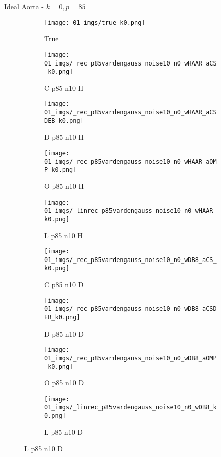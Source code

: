 \begin{frame}{Ideal Aorta - $k=0,p=85$}{}
\begin{figure}
\begin{subfigure}{0.1\textwidth}
\texttt{[image: 01\_imgs/true\_k0.png]}
\caption*{\Tiny True}
\end{subfigure}
\begin{subfigure}{0.1\textwidth}
\texttt{[image: 01\_imgs/\_rec\_p85vardengauss\_noise10\_n0\_wHAAR\_aCS\_k0.png]}
\caption*{\Tiny C p85 n10 H}
\end{subfigure}
\begin{subfigure}{0.1\textwidth}
\texttt{[image: 01\_imgs/\_rec\_p85vardengauss\_noise10\_n0\_wHAAR\_aCSDEB\_k0.png]}
\caption*{\Tiny D p85 n10 H}
\end{subfigure}
\begin{subfigure}{0.1\textwidth}
\texttt{[image: 01\_imgs/\_rec\_p85vardengauss\_noise10\_n0\_wHAAR\_aOMP\_k0.png]}
\caption*{\Tiny O p85 n10 H}
\end{subfigure}
\begin{subfigure}{0.1\textwidth}
\texttt{[image: 01\_imgs/\_linrec\_p85vardengauss\_noise10\_n0\_wHAAR\_k0.png]}
\caption*{\Tiny L p85 n10 H}
\end{subfigure}
\begin{subfigure}{0.1\textwidth}
\texttt{[image: 01\_imgs/\_rec\_p85vardengauss\_noise10\_n0\_wDB8\_aCS\_k0.png]}
\caption*{\Tiny C p85 n10 D}
\end{subfigure}
\begin{subfigure}{0.1\textwidth}
\texttt{[image: 01\_imgs/\_rec\_p85vardengauss\_noise10\_n0\_wDB8\_aCSDEB\_k0.png]}
\caption*{\Tiny D p85 n10 D}
\end{subfigure}
\begin{subfigure}{0.1\textwidth}
\texttt{[image: 01\_imgs/\_rec\_p85vardengauss\_noise10\_n0\_wDB8\_aOMP\_k0.png]}
\caption*{\Tiny O p85 n10 D}
\end{subfigure}
\begin{subfigure}{0.1\textwidth}
\texttt{[image: 01\_imgs/\_linrec\_p85vardengauss\_noise10\_n0\_wDB8\_k0.png]}
\caption*{\Tiny L p85 n10 D}
\end{subfigure}

\vspace{5pt}


\end{figure}
\end{frame}
